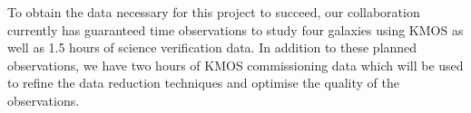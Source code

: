 \documentclass[a4paper,12pt]{article}
\begin{document}
To obtain the data necessary for this project to succeed, our collaboration currently has guaranteed time observations to study four galaxies using KMOS as well as 1.5 hours of science verification data. 
In addition to these planned observations, we have two hours of KMOS commissioning data which will be used to refine the data reduction techniques and optimise the quality of the observations. 


\begin{multicols}{2}
\end{multicols}
\end{document}
